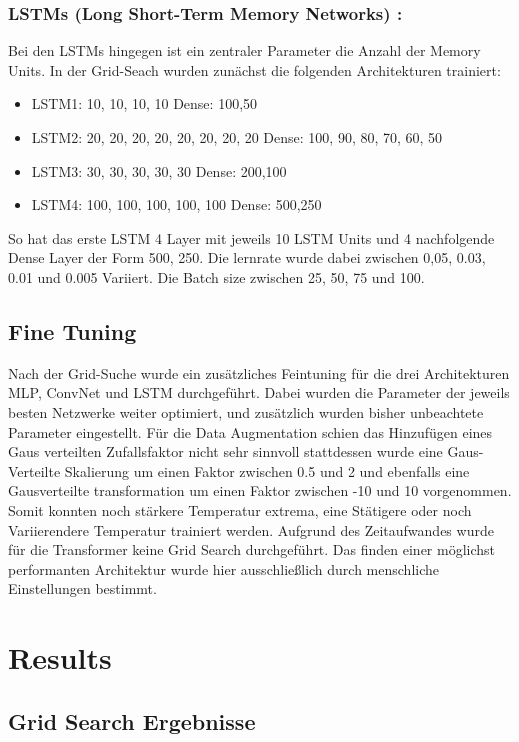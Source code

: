 \documentclass[acmtog, authorversion]{acmart} %
\begin{document}
\subsubsection{LSTMs (Long Short-Term Memory Networks) :}
Bei den LSTMs hingegen ist ein zentraler Parameter die Anzahl der Memory Units. In der Grid-Seach wurden zunächst die folgenden Architekturen trainiert:
\begin{itemize}
    \item LSTM1: 10, 10, 10, 10 Dense: 100,50
    \item LSTM2: 20, 20, 20, 20, 20, 20, 20, 20 Dense: 100, 90, 80, 70, 60, 50
    \item LSTM3: 30, 30, 30, 30, 30 Dense: 200,100
    \item LSTM4: 100, 100, 100, 100, 100 Dense: 500,250
\end{itemize}
So hat das erste LSTM 4 Layer mit jeweils 10 LSTM Units und 4 nachfolgende Dense Layer der Form 500, 250. Die lernrate wurde dabei zwischen 0,05, 0.03, 0.01 und 0.005 Variiert. Die Batch size zwischen 25, 50, 75 und 100.

\subsection{Fine Tuning}
Nach der Grid-Suche wurde ein zusätzliches Feintuning für die drei Architekturen MLP, ConvNet und LSTM durchgeführt. Dabei wurden die Parameter der jeweils besten Netzwerke weiter optimiert, und zusätzlich wurden bisher unbeachtete Parameter eingestellt. Für die Data Augmentation schien das Hinzufügen eines Gaus verteilten Zufallsfaktor nicht sehr sinnvoll stattdessen wurde eine Gaus-Verteilte Skalierung um einen Faktor zwischen 0.5 und 2 und ebenfalls eine Gausverteilte transformation um einen Faktor zwischen -10 und 10 vorgenommen. Somit konnten noch stärkere Temperatur extrema, eine Stätigere oder noch Variierendere Temperatur trainiert werden.
Aufgrund des Zeitaufwandes wurde für die Transformer keine Grid Search durchgeführt. Das finden einer möglichst performanten Architektur wurde hier ausschließlich durch menschliche Einstellungen bestimmt.  

\clearpage
\section{Results}

\subsection{Grid Search Ergebnisse}
\end{document}
